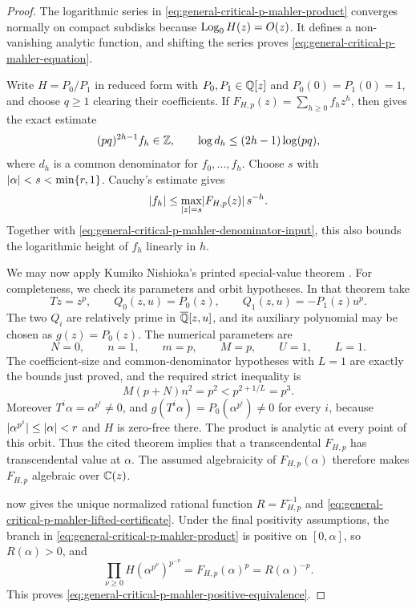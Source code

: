 \begin{proof}
The logarithmic series in \eqref{eq:general-critical-p-mahler-product}
converges normally on compact subdisks because
\(\operatorname{Log}_0H(z)=O(z)\).  It defines a non-vanishing analytic function, and
shifting the series proves \eqref{eq:general-critical-p-mahler-equation}.

Write \(H=P_0/P_1\) in reduced form with
\(P_0,P_1\in\mathbb{Q}[z]\) and \(P_0(0)=P_1(0)=1\), and choose \(q\ge1\) clearing
their coefficients.  If
\(F_{H,p}(z)=\sum_{h\ge0}f_hz^h\), then
 gives the exact estimate
\begin{equation}\label{eq:general-critical-p-mahler-denominator-input}
 (pq)^{2h-1}f_h\in\mathbb{Z},\qquad
 \log d_h\le(2h-1)\log(pq),
\end{equation}
where \(d_h\) is a common denominator for \(f_0,\ldots,f_h\).  Choose
\(s\) with \(\lvert \alpha \rvert<s<\min\{r,1\}\).  Cauchy's estimate gives
\[
 \lvert f_h \rvert\le
 \max_{\lvert z \rvert=s}\lvert F_{H,p}(z) \rvert\,s^{-h}.
\]
Together with \eqref{eq:general-critical-p-mahler-denominator-input}, this
also bounds the logarithmic height of \(f_h\) linearly in \(h\).

We may now apply Kumiko Nishioka's printed special-value theorem
\cite[Theorem, p.~387]{Nishioka1982MahlerFunctionValues}.  For completeness,
we check its parameters and orbit hypotheses.  In that theorem take
\[
 Tz=z^p,\qquad
 Q_0(z,u)=P_0(z),\qquad Q_1(z,u)=-P_1(z)u^p.
\]
The two \(Q_i\) are relatively prime in
\(\overline{\mathbb{Q}}[z,u]\), and its auxiliary polynomial may be chosen as
\(g(z)=P_0(z)\).  The numerical parameters are
\[
 N=0,\qquad n=1,\qquad m=p,\qquad M=p,\qquad U=1,\qquad L=1.
\]
The coefficient-size and common-denominator hypotheses with \(L=1\) are
exactly the bounds just proved, and the required strict inequality is
\[
 M(p+N)n^2=p^2<p^{2+1/L}=p^3.
\]
Moreover \(T^i\alpha=\alpha^{p^i}\ne0\), and
\(g(T^i\alpha)=P_0(\alpha^{p^i})\ne0\) for every \(i\), because
\(\lvert \alpha^{p^i} \rvert\le\lvert \alpha \rvert<r\) and \(H\) is zero-free there.
The product is analytic at every point of this orbit.  Thus the cited theorem
implies that a transcendental \(F_{H,p}\) has transcendental value at
\(\alpha\).  The assumed algebraicity of \(F_{H,p}(\alpha)\) therefore makes
\(F_{H,p}\) algebraic over \(\mathbb{C}(z)\).

 now gives the unique normalized
rational function \(R=F_{H,p}^{-1}\) and
\eqref{eq:general-critical-p-mahler-lifted-certificate}.  Under the final
positivity assumptions, the branch in
\eqref{eq:general-critical-p-mahler-product} is positive on
\([0,\alpha]\), so \(R(\alpha)>0\), and
\[
 \prod_{\nu\ge0}H(\alpha^{p^\nu})^{p^{-\nu}}
 =F_{H,p}(\alpha)^p=R(\alpha)^{-p}.
\]
This proves \eqref{eq:general-critical-p-mahler-positive-equivalence}.
\end{proof}

